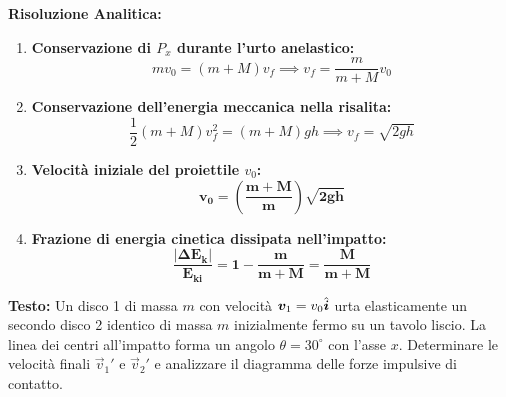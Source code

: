 \textbf{Risoluzione Analitica:}
\begin{enumerate}
    \item \textbf{Conservazione di $P_x$ durante l'urto anelastico:}
    \begin{equation}
        m v_0 = (m + M) v_f \implies v_f = \frac{m}{m + M}v_0
    \end{equation}
    \item \textbf{Conservazione dell'energia meccanica nella risalita:}
    \begin{equation}
        \frac{1}{2}(m + M) v_f^2 = (m + M)gh \implies v_f = \sqrt{2gh}
    \end{equation}
    \item \textbf{Velocità iniziale del proiettile $v_0$:}
    \begin{equation}
        \mathbf{v_0 = \left(\frac{m + M}{m}\right)\sqrt{2gh}}
    \end{equation}
    \item \textbf{Frazione di energia cinetica dissipata nell'impatto:}
    \begin{equation}
        \mathbf{\frac{|\Delta E_k|}{E_{ki}} = 1 - \frac{m}{m+M} = \frac{M}{m + M}}
    \end{equation}
\end{enumerate}

\vspace{0.8em}

\begin{esercizio}
\textbf{Testo:}
Un disco 1 di massa $m$ con velocità $\bm{v}_1 = v_0\hat{\bm{i}}$ urta elasticamente un secondo disco 2 identico di massa $m$ inizialmente fermo su un tavolo liscio. La linea dei centri all'impatto forma un angolo $\theta = 30^\circ$ con l'asse $x$. Determinare le velocità finali $\vec{v}_1'$ e $\vec{v}_2'$ e analizzare il diagramma delle forze impulsive di contatto.
\end{esercizio}

